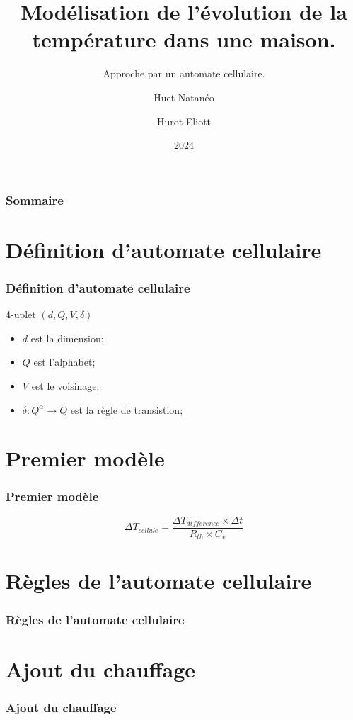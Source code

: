\documentclass{beamer}
\title{Modélisation de l'évolution de la température dans une maison.}
\subtitle{Approche par un automate cellulaire.}
\author{Huet Natanéo \and Hurot Eliott}
\date{2024}
\begin{document}
\frame{\titlepage}

\begin{frame}
    \frametitle{Sommaire}
    \tableofcontents
\end{frame}

\section{Définition d'automate cellulaire}
\begin{frame}
    \frametitle{Définition d'automate cellulaire}

    4-uplet \( ( d, Q, V, \delta) \)
    \begin{itemize}[label=\square]
        \item \(d\) est la dimension;
        \item \(Q\) est l'alphabet;
        \item \(V\) est le voisinage;
        \item \( \delta : Q^{\alpha} \longrightarrow Q \) est la règle de transistion;
    \end{itemize}
\end{frame}

\section{Premier modèle}
\begin{frame}
    \frametitle{Premier modèle}

    \[ 
    \Delta T_{cellule} = \frac{\Delta T_{difference} \times \Delta t} {R_{th} \times C_v} 
    \]

    
    
\end{frame}

\section{Règles de l'automate cellulaire}
\begin{frame}
    \frametitle{Règles de l'automate cellulaire}

\end{frame}

\section{Ajout du chauffage}
\begin{frame}
    \frametitle{Ajout du chauffage}
    
\end{frame}
\end{document}
